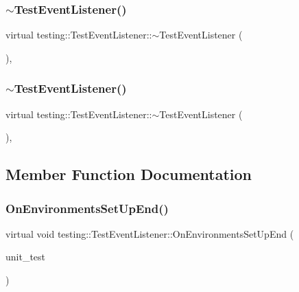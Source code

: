 \subsubsection{\texorpdfstring{$\sim$TestEventListener()}{~TestEventListener()}\hspace{0.1cm}{\footnotesize\ttfamily [2/3]}}
{\footnotesize\ttfamily virtual testing\+::\+Test\+Event\+Listener\+::$\sim$\+Test\+Event\+Listener (\begin{DoxyParamCaption}{ }\end{DoxyParamCaption})\hspace{0.3cm}{\ttfamily [inline]}, {\ttfamily [virtual]}}

\mbox{\label{classtesting_1_1_test_event_listener_a4512d19e7a108ec4926239ec1ea85d63}} 
\subsubsection{\texorpdfstring{$\sim$TestEventListener()}{~TestEventListener()}\hspace{0.1cm}{\footnotesize\ttfamily [3/3]}}
{\footnotesize\ttfamily virtual testing\+::\+Test\+Event\+Listener\+::$\sim$\+Test\+Event\+Listener (\begin{DoxyParamCaption}{ }\end{DoxyParamCaption})\hspace{0.3cm}{\ttfamily [inline]}, {\ttfamily [virtual]}}



\subsection{Member Function Documentation}
\mbox{\label{classtesting_1_1_test_event_listener_aaa1021d75f5dbf3f05c829c1cc520341}} 
\subsubsection{\texorpdfstring{OnEnvironmentsSetUpEnd()}{OnEnvironmentsSetUpEnd()}\hspace{0.1cm}{\footnotesize\ttfamily [1/3]}}
{\footnotesize\ttfamily virtual void testing\+::\+Test\+Event\+Listener\+::\+On\+Environments\+Set\+Up\+End (\begin{DoxyParamCaption}\item[{const \mbox{\hyperlink{classtesting_1_1_unit_test}{Unit\+Test}} \&}]{unit\+\_\+test }\end{DoxyParamCaption})\hspace{0.3cm}{\ttfamily [pure virtual]}}



